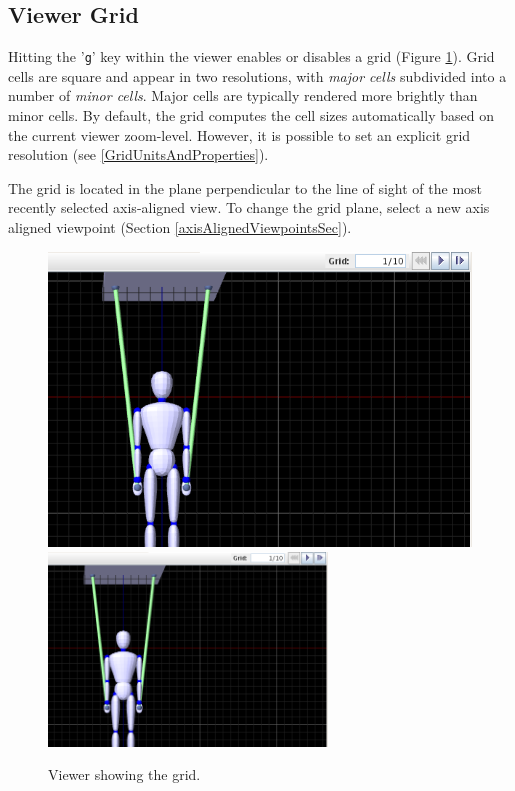 \documentclass{article}
\begin{document}
\subsection{Viewer Grid}
\label{ViewerGrid}

Hitting the '{\tt g}' key within the viewer enables or disables a grid
(Figure \ref{viewerGridFig}). Grid cells are square and appear in two
resolutions, with {\it major cells} subdivided into a number of {\it
minor cells}. Major cells are typically rendered more brightly than
minor cells. By default, the grid computes the cell sizes
automatically based on the current viewer zoom-level. However, it is
possible to set an explicit grid resolution (see
\ref{GridUnitsAndProperties}).

The grid is located in the plane perpendicular to the line of sight of
the most recently selected axis-aligned view. To change the grid
plane, select a new axis aligned viewpoint (Section
\ref{axisAlignedViewpointsSec}).

\begin{figure}
\begin{center}
\iflatexml
\includegraphics[]{images/viewerGrid}
\else
\includegraphics[width=0.66\textwidth]{images/viewerGrid}
\fi
\end{center}
\caption{Viewer showing the grid.}%
\label{viewerGridFig}
\end{figure}
\end{document}
